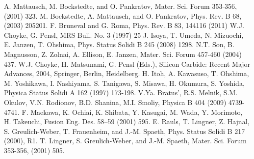      A. Mattausch, M. Bockstedte, and O. Pankratov, Mater. Sci. Forum 353-356, (2001) 323.
     M. Bockstedte, A. Mattausch, and O. Pankratov, Phys. Rev. B 68, (2003) 205201.
     F. Bruneval and G. Roma, Phys. Rev. B 83, 144116 (2011)
     W.J. Choyke, G. Pensl, MRS Bull. No. 3 (1997) 25
     J. Isoya, T. Umeda, N. Mizuochi, E. Janzen, T. Ohshima, Phys. Status Solidi B 245 (2008) 1298. 
     N.T. Son, B. Magnusson, Z. Zolnai, A. Ellison, E. Janzen, Mater. Sci. Forum 457-460 (2004) 437.
     W.J. Choyke, H. Matsunami, G. Pensl (Eds.), Silicon Carbide: Recent Major Advances, 2004, Springer, Berlin, Heidelberg.
     H. Itoh, A. Kawasuso, T. Ohshima, M. Yoshikawa, I. Nashiyama, S. Tanigawa, S. Misawa, H. Okumura, S. Yoshida, Physica Status Solidi A 162 (1997) 173-198.
     V.Ya. Bratus’, R.S. Melnik, S.M. Okulov, V.N. Rodionov, B.D. Shanina, M.I. Smoliy, Physica B 404 (2009) 4739-4741.
     F. Maekawa, K. Ochiai, K. Shibata, Y. Kasugai, M. Wada, Y. Morimoto, H. Takeuchi, Fusion Eng. Des. 58–59 (2001) 595.
     E. Rauls, T. Lingner, Z. Hajnal, S. Greulich-Weber, T. Frauenheim, and J.-M. Spaeth, Phys. Status Solidi B 217 (2000), R1.
     T. Lingner, S. Greulich-Weber, and J.-M. Spaeth, Mater. Sci. Forum 353-356, (2001) 505.
